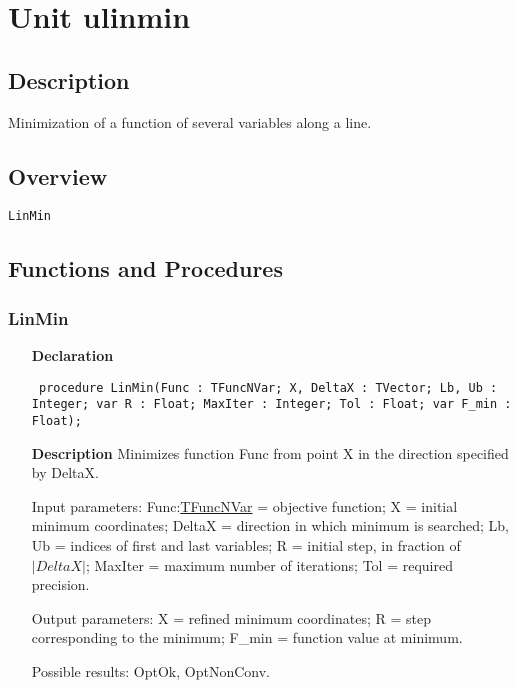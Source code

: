 \documentclass[12pt,a4paper,oneside]{report}
\newcommand{\declarationitem}[1]{\textbf{#1}}
\newcommand{\descriptiontitle}[1]{\textbf{#1}}
\newcommand{\code}[1]{\texttt{#1}}
\begin{document}
\section{Unit ulinmin}
\label{ulinmin}
\subsection{Description}
Minimization of a function of several variables along a line.
\subsection{Overview}
\begin{description}
	\item[\texttt{LinMin}]
\end{description}
\subsection{Functions and Procedures}
\subsubsection{LinMin}
\label{ulinmin-LinMin}
\begin{itemize}\item[\declarationitem{Declaration}\hfill]
	\begin{flushleft}
		\code{
			procedure LinMin(Func : TFuncNVar; X, DeltaX : TVector; Lb, Ub : Integer; var R : Float; MaxIter : Integer; Tol : Float; var F{\_}min : Float);}
		
	\end{flushleft}
	
	\par
	\item[\descriptiontitle{Description}]
	Minimizes function Func from point X in the direction specified by DeltaX.
	
	Input parameters: Func:\hyperref[utypes-TFuncNVar]{TFuncNVar} = objective function; X = initial minimum coordinates; DeltaX = direction in which minimum is searched; Lb, Ub = indices of first and last variables; R = initial step, in fraction of $|DeltaX|$; MaxIter = maximum number of iterations; Tol = required precision.
	
	Output parameters: X = refined minimum coordinates; R = step corresponding to the minimum; F{\_}min = function value at minimum.
	
	Possible results: OptOk, OptNonConv.
	
\end{itemize}
\end{document}
